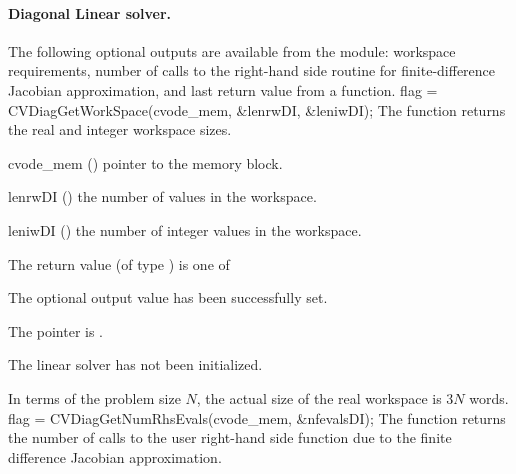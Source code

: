 %
%
\noindent\paragraph{\bf Diagonal Linear solver.}
The following optional outputs are available from the {\cvdiag} module:
workspace requirements, number of calls to the right-hand side routine for 
finite-difference Jacobian approximation, and last return value from a 
{\cvdiag} function.
{
  flag = CVDiagGetWorkSpace(cvode\_mem, \&lenrwDI, \&leniwDI);
}
{
  The function  returns the
  {\cvdiag} real and integer workspace sizes.
}
{
  \begin{args}
  \item[cvode\_mem] ()
    pointer to the {\cvode} memory block.
  \item[lenrwDI] ()
    the number of  values in the {\cvdiag} workspace.
  \item[leniwDI] ()
    the number of integer values in the {\cvdiag} workspace.
  \end{args}
}
{
  The return value  (of type ) is one of
  \begin{args}
  \item[\Id{CVDIAG\_SUCCESS}] 
    The optional output value has been successfully set.
  \item[\Id{CVDIAG\_MEM\_NULL}]
    The  pointer is .
  \item[\Id{CVDIAG\_LMEM\_NULL}]
    The {\cvdiag} linear solver has not been initialized.
  \end{args}
}
{
  In terms of the problem size $N$, the actual size of the real workspace
  is $3 N$  words.
}
{
  flag = CVDiagGetNumRhsEvals(cvode\_mem, \&nfevalsDI);
}
{
  The function  returns the
  number of calls to the user right-hand side function due to the 
  finite difference Jacobian approximation.
}
